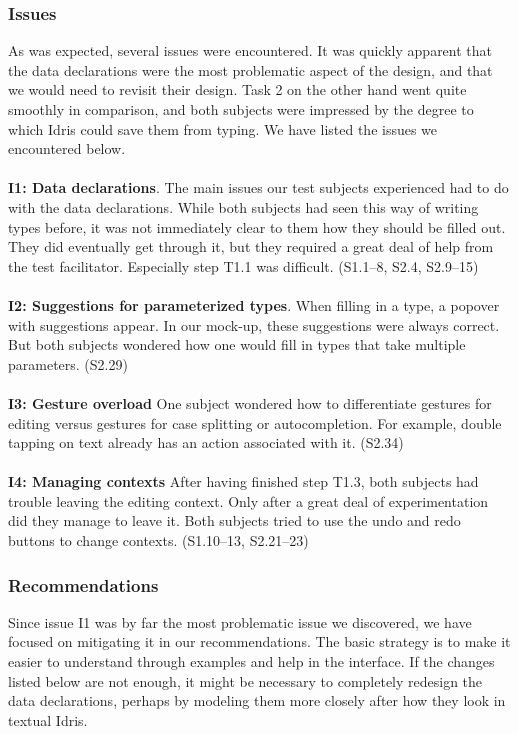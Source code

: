 \subsubsection{Issues}
\label{sec:first_issues}
As was expected, several issues were encountered. It was quickly apparent that
the data declarations were the most problematic aspect of the design, and that
we would need to revisit their design. Task 2 on the other hand went quite
smoothly in comparison, and both subjects were impressed by the degree to
which Idris could save them from typing. We have listed the issues we
encountered below. \\ \\
\textbf{I1: Data declarations}.
The main issues our test subjects experienced had to do with the data
declarations. While both subjects had seen this way of writing types
before, it was not immediately clear to them how they should be filled out.
They did eventually get through it, but they required a great deal of help
from the test facilitator. Especially step T1.1 was difficult. (S1.1--8, S2.4, S2.9--15)\\ \\
\textbf{I2: Suggestions for parameterized types}.
When filling in a type, a popover with suggestions appear. In our mock-up,
these suggestions were always correct. But both subjects wondered how one would
fill in types that take multiple parameters. (S2.29) \\ \\
\textbf{I3: Gesture overload}
One subject wondered how to differentiate gestures for editing versus
gestures for case splitting or autocompletion. For example, double tapping on
text already has an action associated with it. (S2.34) \\ \\
\textbf{I4: Managing contexts}
After having finished step T1.3, both subjects had trouble leaving the editing
context. Only after a great deal of experimentation did they manage to leave
it. Both subjects tried to use the undo and redo buttons to change contexts.
(S1.10--13, S2.21--23)

\subsubsection{Recommendations}
\label{sec:first_recommendations}
Since issue I1 was by far the most problematic issue we discovered, we have
focused on mitigating it in our recommendations. The basic strategy is to make
it easier to understand through examples and help in the interface. If the
changes listed below are not enough, it might be necessary to completely
redesign the data declarations, perhaps by modeling them more closely after how
they look in textual Idris.

